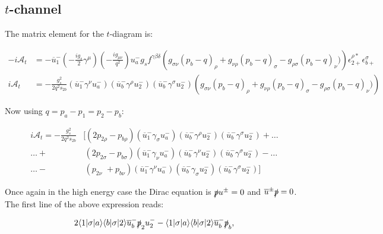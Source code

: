		\subsection{$t$-channel}

			The matrix element for the $t$-diagram is:

			\begin{equation}
			\begin{split}
			-i\mathcal{A}_t &=-\overline{u}^-_1\left(-\frac{ig_s}{2}\gamma^\mu\right)\left(-\frac{ig_{\mu\nu}}{q^2}\right)u^-_ag_sf^{\gamma\beta\delta}
			\left(g_{\sigma\nu}(p_b-q)_\rho + g_{\nu\rho}(p_b-q)_\sigma - g_{\rho\sigma}(p_b-q)_\nu)\right)\epsilon^{\rho *}_{2+}\epsilon^{\sigma}_{b+}\\
			i\mathcal{A}_t &=-\frac{g_s^2}{2q^2s_{2b}}\left(\overline{u}^-_1\gamma^{\nu}u^-_a\right)\left(\overline{u}^-_b\gamma^{\rho}u^-_2\right)
			\left(\overline{u}^-_b\gamma^{\sigma}u^-_2\right)\left(g_{\sigma\nu}(p_b-q)_\rho + g_{\nu\rho}(p_b-q)_\sigma - g_{\rho\sigma}(p_b-q)_\nu)\right)
			\end{split}
			\end{equation}

			Now using $q=p_a-p_1=p_2-p_b$:

			\begin{align*}
			i\mathcal{A}_t = -\frac{g_s^2}{2q^2s_{2b}}&[(2p_{2\rho}-p_{b\rho})\left(\overline{u}^-_1\gamma_{\sigma}u^-_a\right)\left(\overline{u}^-_b\gamma^{\rho}u^-_2\right)\left(\overline{u}^-_b\gamma^{\sigma}u^-_2\right)+\ldots \\
			\ldots +&\hspace{2pt} (2p_{2\sigma}-p_{b\sigma})\left(\overline{u}^-_1\gamma_{\nu}u^-_a\right)\left(\overline{u}^-_b\gamma^{\nu}u^-_2\right)\left(\overline{u}^-_b\gamma^{\sigma}u^-_2\right)-\ldots \\
			\ldots -&\hspace{2pt} (p_{2\nu}\hspace{4pt}+p_{b\nu})\left(\overline{u}^-_1\gamma^{\nu}u^-_a\right)\left(\overline{u}^-_b\gamma_{\sigma}u^-_2\right)\left(\overline{u}^-_b\gamma^{\sigma}u^-_2\right)]
			\end{align*}

			Once again in the high energy case the Dirac equation is $\slashed pu^\pm=0$ and $\overline{u}^\pm\slashed p=0$.  The first line of the above expression reads:

			\begin{equation}
			2\langle1|\sigma|a\rangle\langle b|\sigma|2\rangle\overline{u}^-_b\slashed p_2u^-_2 - \langle1|\sigma|a\rangle\langle b|\sigma|2\rangle\overline{u}^-_b\slashed p_b,
			\end{equation}

